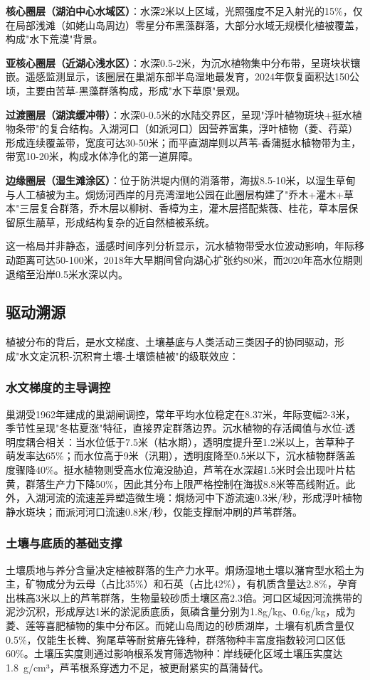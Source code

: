 \textbf{核心圈层（湖泊中心水域区）}：水深2米以上区域，光照强度不足入射光的15\%，仅在局部浅滩（如姥山岛周边）零星分布黑藻群落，大部分水域无规模化植被覆盖，构成"水下荒漠"背景。

\textbf{亚核心圈层（近湖心浅水区）}：水深0.5-2米，为沉水植物集中分布带，呈斑块状镶嵌。遥感监测显示，该圈层在巢湖东部半岛湿地最发育，2024年恢复面积达150公顷，主要由苦草-黑藻群落构成，形成"水下草原"景观。

\textbf{过渡圈层（湖滨缓冲带）}：水深0-0.5米的水陆交界区，呈现"浮叶植物斑块+挺水植物条带"的复合结构。入湖河口（如派河口）因营养富集，浮叶植物（菱、荇菜）形成连续覆盖带，宽度可达30-50米；而平直湖岸则以芦苇-香蒲挺水植物带为主，带宽10-20米，构成水体净化的第一道屏障。

\textbf{边缘圈层（湿生滩涂区）}：位于防洪堤内侧的消落带，海拔8.5-10米，以湿生草甸与人工植被为主。烔炀河西岸的月亮湾湿地公园在此圈层构建了"乔木+灌木+草本"三层复合群落，乔木层以柳树、香樟为主，灌木层搭配紫薇、桂花，草本层保留原生虉草，形成结构复杂的近自然植被系统。

这一格局并非静态，遥感时间序列分析显示，沉水植物带受水位波动影响，年际移动距离可达50-100米，2018年大旱期间曾向湖心扩张约80米，而2020年高水位期则退缩至沿岸0.5米水深以内。

\subsection{驱动溯源}
植被分布的背后，是水文梯度、土壤基底与人类活动三类因子的协同驱动，形成"水文定沉积-沉积育土壤-土壤馈植被"的级联效应：

\subsubsection{水文梯度的主导调控}
巢湖受1962年建成的巢湖闸调控，常年平均水位稳定在8.37米，年际变幅2-3米，季节性呈现"冬枯夏涨"特征，直接界定群落边界。沉水植物的存活阈值与水位-透明度耦合相关：当水位低于7.5米（枯水期），透明度提升至1.2米以上，苦草种子萌发率达65\%；而水位高于9米（汛期），透明度降至0.5米以下，沉水植物群落盖度骤降40\%。挺水植物则受高水位淹没胁迫，芦苇在水深超1.5米时会出现叶片枯黄，群落生产力下降50\%，因此其分布上限严格控制在海拔8.8米等高线附近。此外，入湖河流的流速差异塑造微生境：烔炀河中下游流速0.3米/秒，形成浮叶植物静水斑块；而派河河口流速0.8米/秒，仅能支撑耐冲刷的芦苇群落。

\subsubsection{土壤与底质的基础支撑}
土壤质地与养分含量决定植被群落的生产力水平。烔炀湿地土壤以潴育型水稻土为主，矿物成分为云母（占比35\%）和石英（占比42\%），有机质含量达2.8\%，孕育出株高3米以上的芦苇群落，生物量较砂质土壤区高2.3倍。河口区域因河流携带的泥沙沉积，形成厚达1米的淤泥质底质，氮磷含量分别为1.8g/kg、0.6g/kg，成为菱、莲等喜肥植物的集中分布区。而姥山岛周边的砂质湖岸，土壤有机质含量仅0.5\%，仅能生长稗、狗尾草等耐贫瘠先锋种，群落物种丰富度指数较河口区低60\%。土壤压实度则通过影响根系发育筛选物种：岸线硬化区域土壤压实度达1.8~g/cm³，芦苇根系穿透力不足，被更耐紧实的菖蒲替代。

